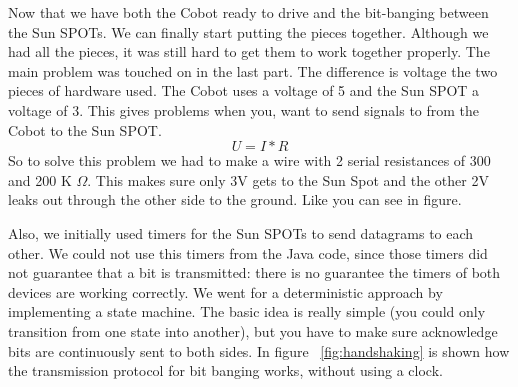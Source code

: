 \documentclass[a4paper,10pt]{article} %
\begin{document}
Now that we have both the Cobot ready to drive and the bit-banging between the
Sun SPOTs. We can finally start putting the pieces together. Although we had all
the pieces, it was still hard to get them to work together properly.  The main
problem was touched on in the last part. The difference is voltage the two
pieces of hardware used. The Cobot uses a voltage of 5 and the Sun SPOT a
voltage of 3. This gives problems when you, want to send signals to from the
Cobot to the Sun SPOT.  \begin{equation} \label{eq:voltage} U = I*R
\end{equation}
So to solve this problem we had to make a wire with 2 serial resistances of 300
and 200 K $\Omega$. This makes sure only 3V gets to the Sun Spot and the
other 2V leaks out through the other side to the ground. Like you can see in 
figure.

Also, we initially used timers for the Sun SPOTs to send datagrams to each
other. We could not use this timers from the Java code, since those timers did
not guarantee that a bit is transmitted: there is no guarantee the timers of
both devices are working correctly. We went for a deterministic approach by
implementing a state machine. The basic idea is really simple (you could only
transition from one state into another), but you have to make sure acknowledge
bits are continuously sent to both sides. In figure ~\ref{fig:handshaking} is
shown how the transmission protocol for bit banging works, without using a
clock.
\end{document}
